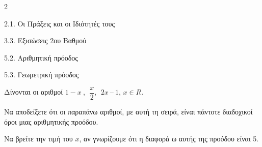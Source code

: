 \begin{ylh}{2}
    \item 2.1. Οι Πράξεις και οι Ιδιότητές τους
    \item 3.3. Εξισώσεις 2ου Βαθμού
    \item 5.2. Αριθμητική πρόοδος
    \item 5.3. Γεωμετρική πρόοδος
\end{ylh}
Δίνονται οι αριθμοί $1 - x\ ,\ \ \dfrac{x}{2},\ \ 2x\ –\ 1$, $x \in R$.
\begin{alist}
\item Να αποδείξετε ότι οι παραπάνω αριθμοί, με αυτή τη σειρά, είναι πάντοτε διαδοχικοί όροι μιας αριθμητικής προόδου.
\item Να βρείτε την τιμή του $x$, αν γνωρίζουμε ότι η διαφορά ω αυτής της προόδου είναι 5.
\end{alist}

